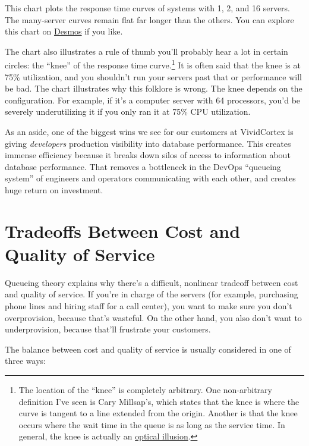 \documentclass{vivid_layout}
\begin{document}
This chart plots the response time curves of systems with 1, 2, and 16 servers. The many-server curves remain flat far longer than the others. You can explore this chart on \href{https://www.desmos.com/calculator/iwaj9vujiu}{Desmos} if you like.

The chart also illustrates a rule of thumb you'll probably hear a lot in certain
circles: the ``knee'' of the response time curve.\footnote{The location of the
``knee'' is completely arbitrary. One non-arbitrary definition I've seen is
Cary Millsap's, which states that the knee is where the curve is tangent to a
line extended from the origin. Another is that the knee occurs where the wait
time in the queue is as long as the service time. In general, the knee is actually an
\href{http://perfdynamics.blogspot.com/2008/03/watching-your-knees-and-queues.html}{optical
illusion}.} It is often said that the knee is at 75\% utilization, and you
shouldn't run your servers past that or performance will be bad. The chart
illustrates why this folklore is wrong. The knee depends on the configuration.
For example, if it's a computer server with 64 processors, you'd be severely
underutilizing it if you only ran it at 75\% CPU utilization.

As an aside, one of the biggest wins we see for our customers at VividCortex is giving {\itshape developers} production visibility into database performance. This creates immense efficiency because it breaks down silos of access to information about database performance. That removes a bottleneck in the DevOps ``queueing system'' of engineers and operators communicating with each other, and creates huge return on investment.

\section{Tradeoffs Between Cost and Quality of Service}

Queueing theory explains why there's a difficult, nonlinear tradeoff between
cost and quality of service. If you're in charge of the servers (for example,
purchasing phone lines and hiring staff for a call center), you want to make
sure you don't overprovision, because that's wasteful. On the other hand, you
also don't want to underprovision, because that'll frustrate your customers.

The balance between cost and quality of service is usually considered in one of
three ways:
\end{document}
